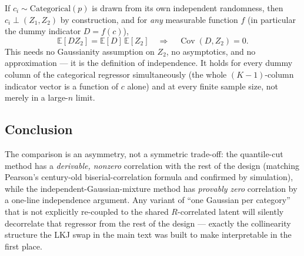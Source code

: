 \documentclass[11pt]{article}
\begin{document}
If $c_i \sim \mathrm{Categorical}(p)$ is drawn from its own independent
randomness, then $c_i \perp (Z_1, Z_2)$ by construction, and for \emph{any}
measurable function $f$ (in particular the dummy indicator $D = f(c)$),
\[
  \mathbb E[D Z_2] = \mathbb E[D]\,\mathbb E[Z_2]
  \quad\Longrightarrow\quad
  \operatorname{Cov}(D, Z_2) = 0.
\]
This needs no Gaussianity assumption on $Z_2$, no asymptotics, and no
approximation --- it is the definition of independence. It holds for every
dummy column of the categorical regressor simultaneously (the whole
$(K{-}1)$-column indicator vector is a function of $c$ alone) and at every
finite sample size, not merely in a large-$n$ limit.

\subsection*{Conclusion}

The comparison is an asymmetry, not a symmetric trade-off: the quantile-cut
method has a \emph{derivable, nonzero} correlation with the rest of the design
(matching Pearson's century-old biserial-correlation formula and confirmed by
simulation), while the independent-Gaussian-mixture method has \emph{provably
zero} correlation by a one-line independence argument. Any variant of ``one
Gaussian per category'' that is not explicitly re-coupled to the shared
$R$-correlated latent will silently decorrelate that regressor from the rest
of the design --- exactly the collinearity structure the LKJ swap in the main
text was built to make interpretable in the first place.
\end{document}
